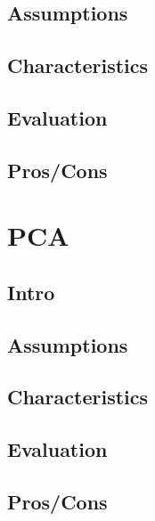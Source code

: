 \documentclass[]{book}
\begin{document}
\subsection{Assumptions}\label{assumptions-3}

\subsection{Characteristics}\label{characteristics}

\subsection{Evaluation}\label{evaluation-3}

\subsection{Pros/Cons}\label{proscons-4}

\section{PCA}\label{pca}

\subsection{Intro}\label{intro-5}

\subsection{Assumptions}\label{assumptions-4}

\subsection{Characteristics}\label{characteristics-1}

\subsection{Evaluation}\label{evaluation-4}

\subsection{Pros/Cons}\label{proscons-5}
\end{document}
